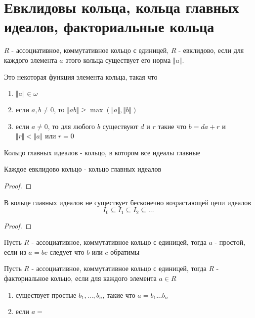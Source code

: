 \documentclass[../main/document.tex]{subfiles}
\begin{document}
\section{Евклидовы кольца, кольца главных идеалов, факториальные кольца}
\begin{dfn}
$R$ - ассоциативное, коммутативное кольцо с единицей, $R$ - евклидово, если для каждого элемента $a$ этого кольца существует его норма $\Vert a\Vert$.
\end{dfn}
\begin{dfn}
Это некоторая функция элемента кольца, такая что
\begin{enumerate}
\item $\Vert a\Vert \in \omega$
\item если $a,b\neq 0$, то $\Vert ab\Vert \geq \max(\Vert a\Vert,\Vert b\Vert)$
\item если $a\neq 0$, то для любого $b$ существуют $d$ и $r$ такие что $b=da+r$ и $\Vert r\Vert < \Vert a\Vert$ или $r=0$
\end{enumerate}
\end{dfn}
\begin{dfn}
Кольцо главных идеалов - кольцо, в котором все идеалы главные
\end{dfn}
\begin{thm}
Каждое евклидово кольцо - кольцо главных идеалов
\begin{proof}

\end{proof}
\end{thm}
\begin{thm}
В кольце главных идеалов не существует бесконечно возрастающей цепи идеалов
$$I_0\subseteq I_1\subseteq I_2\subseteq ...$$
\begin{proof}

\end{proof}
\end{thm}
\begin{dfn}
Пусть $R$ - ассоциативное, коммутативное кольцо с единицей, тогда $a$ - простой, если из $a=bc$ следует что $b$ или $c$ обратимы
\end{dfn}
\begin{dfn}
Пусть $R$ - ассоциативное, коммутативное кольцо с единицей, тогда $R$ - факториальное кольцо, если для каждого элемента $a\in R$
\begin{enumerate}
\item существует простые $b_1,...,b_n$, такие что $a=b_1...b_n$
\item если $a=$
\end{enumerate} 
\end{dfn}
\end{document}
